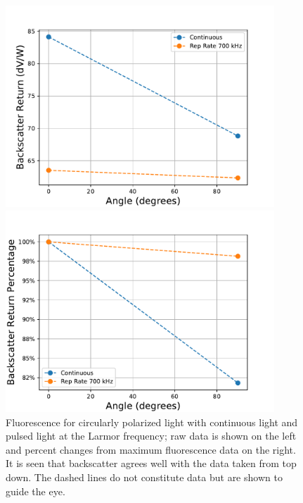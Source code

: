 \begin{figure}[htb]
	\centering
	\begin{minipage}{.49\textwidth}
	\centering
		\includegraphics[width=0.9\textwidth]{../../MRPData/Backscatter/backscatter.pdf}
	\end{minipage}
	\begin{minipage}{.49\textwidth}
	\centering
		\includegraphics[width=0.9\textwidth]{../../MRPData/Backscatter/backscatterScaled.pdf}
	\end{minipage}
	\caption{Fluorescence for circularly polarized light with continuous light and pulsed light at the Larmor frequency; raw data is shown on the left and percent changes from maximum fluorescence data on the right. It is seen that backscatter agrees well with the data taken from top down. The dashed lines do not constitute data but are shown to guide the eye.}
	\label{fig:backscatter}
\end{figure}


